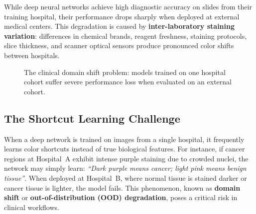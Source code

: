 \documentclass[11pt,a4paper]{article}
\begin{document}
While deep neural networks achieve high diagnostic accuracy on slides from their training hospital, their performance drops sharply when deployed at external medical centers. This degradation is caused by \textbf{inter-laboratory staining variation}: differences in chemical brands, reagent freshness, staining protocols, slice thickness, and scanner optical sensors produce pronounced color shifts between hospitals.

\begin{figure}[htbp]
\centering
{}
\caption{The clinical domain shift problem: models trained on one hospital cohort suffer severe performance loss when evaluated on an external cohort.}
\label{fig:domainshift}
\end{figure}


\subsection{The Shortcut Learning Challenge}
When a deep network is trained on images from a single hospital, it frequently learns color shortcuts instead of true biological features. For instance, if cancer regions at Hospital~A exhibit intense purple staining due to crowded nuclei, the network may simply learn: \textit{``Dark purple means cancer; light pink means benign tissue''}. When deployed at Hospital~B, where normal tissue is stained darker or cancer tissue is lighter, the model fails. This phenomenon, known as \textbf{domain shift} or \textbf{out-of-distribution (OOD) degradation}, poses a critical risk in clinical workflows.
\end{document}
